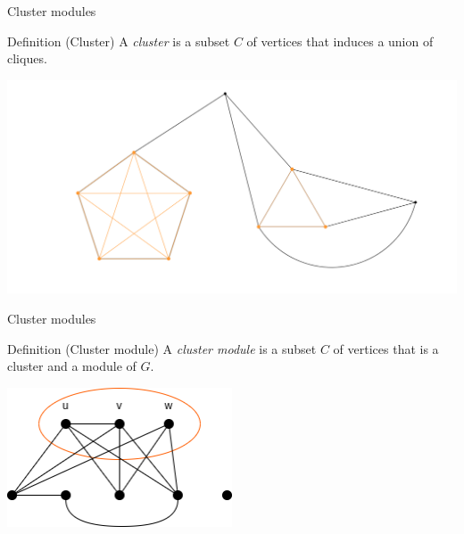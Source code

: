 \documentclass{beamer}
\begin{document}
\begin{frame}{Cluster modules}
    \begin{block}{Definition (Cluster)}
        A \emph{cluster} is a subset $C$ of vertices that induces a union of cliques.
    \end{block}
        
    \begin{center}
        \includegraphics[width=1\textwidth]{img/cluster.png}
    \end{center}
\end{frame}

\begin{frame}{Cluster modules}
    \begin{block}{Definition (Cluster module)}
        A \emph{cluster module} is a subset $C$ of vertices that is a cluster and a module of $G$.
    \end{block}

    \begin{center}
        \includegraphics[width=0.5\textwidth]{img/module.png}
    \end{center}
\end{frame}
\end{document}
